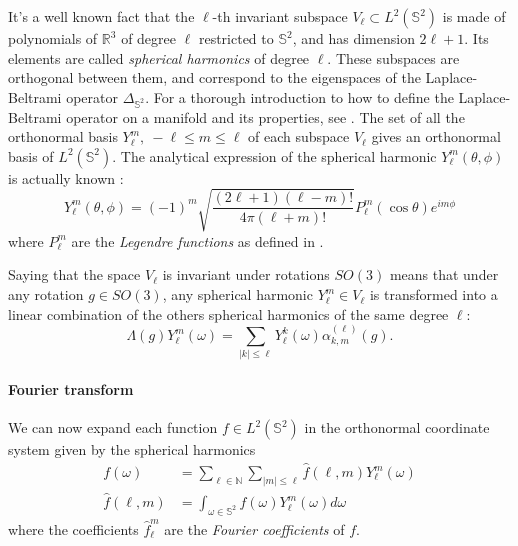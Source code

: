 It's a well known fact \cite{Driscoll:1994:CFT:184069.184073} that the $\ell$-th invariant subspace $V_\ell\subset L^2(\mathbb S^2)$ is made of polynomials of $\mathbb R^3$ of degree $\ell$ restricted to $\mathbb S^2$, and has dimension $2\ell+1$. Its elements are called \textit{spherical harmonics} of degree $\ell$. These subspaces are orthogonal between them, and correspond to the eigenspaces of the Laplace-Beltrami operator $\Delta_{\mathbb S^2}$. For a thorough introduction to how to define the Laplace-Beltrami operator on a manifold and its properties, see \cite{rosenberg_1997}. The set of all the orthonormal basis $Y_\ell^m,\ -\ell\leq m\leq\ell$ of each subspace $V_\ell$ gives an orthonormal basis of $L^2(\mathbb S^2)$. The analytical expression of the spherical harmonic $Y_\ell^m(\theta, \phi)$ is actually known \cite{Driscoll:1994:CFT:184069.184073}:
\begin{equation}\label{eq:spherical harmonics}
	Y_\ell^m(\theta, \phi) = (-1)^{m} \sqrt{\frac{(2 \ell+1)(\ell-m) !}{4 \pi(\ell+m) !}} P_{\ell}^{m}(\cos \theta) e^{i m \phi}
\end{equation}
where $P_{\ell}^{m}$ are the \textit{Legendre functions} as defined in \cite{Driscoll:1994:CFT:184069.184073}. 
\vspace{0.5cm}
\begin{remark}
	Saying that the space $V_\ell$ is invariant under rotations $SO(3)$ means that under any rotation $g\in SO(3)$, any spherical harmonic $Y_\ell^m\in V_\ell$ is transformed into a linear combination of the others spherical harmonics of the same degree $\ell$:
	$$
	\Lambda(g) Y_{\ell}^{m}(\omega)=\sum_{|k| \leq \ell} Y_{\ell}^{k}(\omega) \alpha_{k, m}^{(\ell)}(g).
	$$
\end{remark}
\vspace{0.5cm}

\paragraph{Fourier transform}
We can now expand each function $f\in L^2(\mathbb S^2)$ in the orthonormal coordinate system given by the spherical harmonics 
\begin{align}\label{eq:inverse spherical fourier transform}
	f(\omega) &= \sum_{\ell\in\mathbb N}\sum_{|m|\leq \ell}\hat f(\ell,m) Y_\ell^m(\omega)\\
	\hat f(\ell,m) &=\int_{\omega\in\mathbb S^2}f(\omega)Y_\ell^m(\omega)d\omega \label{eq:SHT}
\end{align}
where the coefficients $\hat f_\ell^m$ are the \textit{Fourier coefficients} of $f$.

